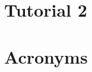 \documentclass[10pt]{book}
\begin{document}
\listoftables
\clearpage

\listoffigures
\clearpage



%


\chapter{Tutorial 2}









\printbibliography

\clearpage  
\newpage

\appendix
\chapter{Acronyms}



\clearpage  
\newpage
\end{document}
